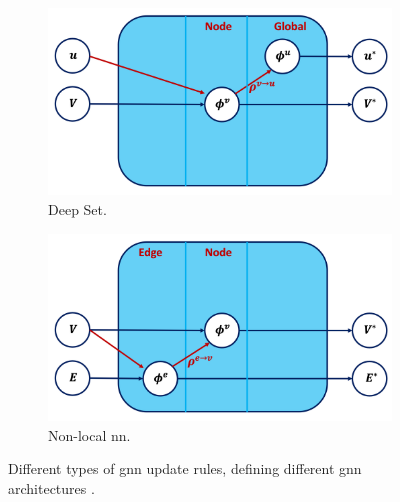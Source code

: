 \begin{figure}[h!]
    \begin{subfigure}[b]{0.49\textwidth}
        \centering
        \includegraphics[scale=0.43]{Images/ML/deepSet.png}
        \caption{Deep Set.} 
        \label{fig:deepSetFig}
    \end{subfigure}
    \hfill
    \begin{subfigure}[b]{0.49\textwidth}
        \centering
        \includegraphics[scale=0.43]{Images/ML/nlnn.png}
        \caption{Non-local \gls{nn}.} 
        \label{fig:pullsFTAGnlnn}
    \end{subfigure}
    \caption{Different types of \gls{gnn} update rules, defining different \gls{gnn} architectures \cite{graphInductiveBias}.}
    \label{fig:diverseGNN}
\end{figure} 

